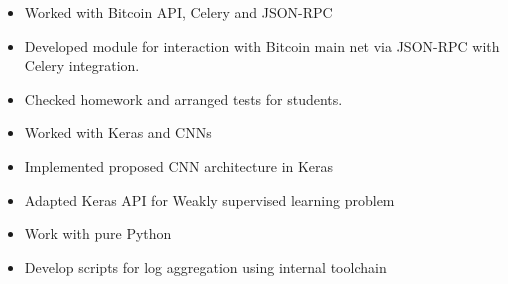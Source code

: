 \documentclass[10pt,a4paper,ragged2e]{altacv}
\begin{document}
%


\begin{itemize}
    \item Worked with Bitcoin API, Celery and JSON-RPC
    \item Developed module for interaction with Bitcoin main net via JSON-RPC with Celery integration.
\end{itemize}
\divider

\begin{itemize}
	\item Checked homework and arranged tests for students.
\end{itemize}
\divider

\begin{itemize}
	\item Worked with Keras and CNNs
    \item Implemented proposed CNN architecture in Keras
    \item Adapted Keras API for Weakly supervised learning problem
\end{itemize}
\divider

\begin{itemize}
	\item Work with pure Python
    \item Develop scripts for log aggregation using internal toolchain
\end{itemize}





\end{document}
